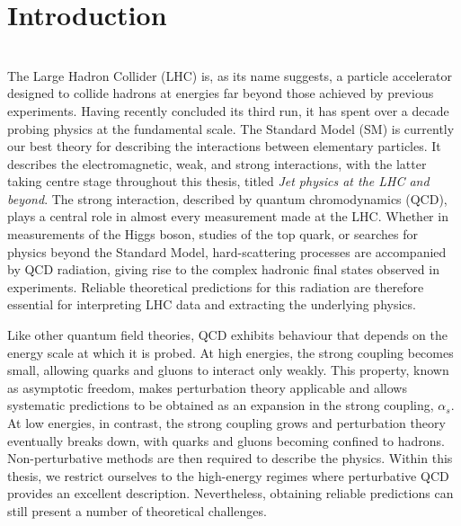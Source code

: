 \chapter{Introduction}
\label{ch:intro}
 \\
The Large Hadron Collider (LHC) is, as its name suggests, a particle accelerator
designed to collide hadrons at energies far beyond those achieved by previous
experiments. Having recently concluded its third run, it has spent over a decade
probing physics at the fundamental scale. The Standard Model (SM) is currently our
best theory for describing the interactions between elementary particles. It
describes the electromagnetic, weak, and strong interactions, with the latter
taking centre stage throughout this thesis, titled \emph{Jet physics at the LHC
and beyond}. The strong interaction, described by quantum chromodynamics (QCD),
plays a central role in almost every measurement made at the LHC. Whether in
measurements of the Higgs boson, studies of the top quark, or searches for physics
beyond the Standard Model, hard-scattering processes are accompanied by QCD
radiation, giving rise to the complex hadronic final states observed in
experiments. Reliable theoretical predictions for this radiation are therefore
essential for interpreting LHC data and extracting the underlying physics.

Like other quantum field theories, QCD exhibits behaviour that depends on the
energy scale at which it is probed. At high energies, the strong coupling becomes
small, allowing quarks and gluons to interact only weakly. This property, known as
asymptotic freedom, makes perturbation theory applicable and allows systematic
predictions to be obtained as an expansion in the strong coupling, $\alpha_s$. At low energies,
in contrast, the strong coupling grows and perturbation theory eventually breaks
down, with quarks and gluons becoming confined to hadrons. Non-perturbative
methods are then required to describe the physics. Within this thesis, we restrict
ourselves to the high-energy regimes where perturbative QCD provides
an excellent description. Nevertheless, obtaining reliable predictions can still present a number of
theoretical challenges.

